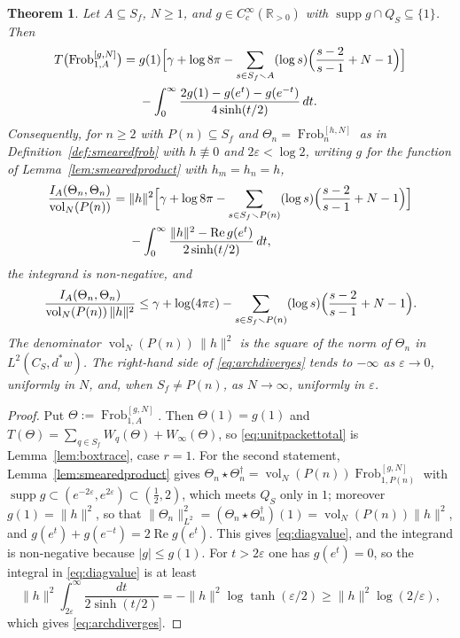 \documentclass[11pt]{amsart}
\newtheorem{theorem}{Theorem}[section]
\theoremstyle{definition}
\newcommand{\R}{\mathbb R}
\newcommand{\Rel}{\operatorname{Re}}
\newcommand{\Frob}{\operatorname{Frob}}
\newcommand{\supp}{\operatorname{supp}}
\newcommand{\vol}{\operatorname{vol}}
\begin{document}
\begin{theorem}\label{thm:gramdiag}
Let $A\subseteq S_f$, $N\ge1$, and $g\in C_c^\infty(\R_{>0})$ with
$\supp g\cap Q_S\subseteq\{1\}$. Then
\begin{equation}\label{eq:unitpackettotal}
\begin{aligned}
  T\bigl(\Frob_{1,A}^{[g,N]}\bigr)={}&g(1)\Bigl[\gamma+\log8\pi
   -\sum_{s\in S_f\smallsetminus A}(\log s)\Bigl(\frac{s-2}{s-1}+N-1\Bigr)
   \Bigr]\\
  &-\int_0^\infty\frac{2g(1)-g(e^t)-g(e^{-t})}{4\sinh(t/2)}\,dt .
\end{aligned}
\end{equation}
Consequently, for $n\ge2$ with $P(n)\subseteq S_f$ and
$\Theta_n=\Frob_n^{[h,N]}$ as in Definition~\ref{def:smearedfrob} with
$h\not\equiv0$ and $2\varepsilon<\log2$, writing $g$ for the function of
Lemma~\ref{lem:smearedproduct} with $h_m=h_n=h$,
\begin{equation}\label{eq:diagvalue}
\begin{aligned}
  \frac{I_A(\Theta_n,\Theta_n)}{\vol_N(P(n))}={}&\|h\|^2\Bigl[\gamma+\log8\pi
   -\sum_{s\in S_f\smallsetminus P(n)}(\log s)\Bigl(\frac{s-2}{s-1}+N-1\Bigr)
   \Bigr]\\
  &-\int_0^\infty\frac{\|h\|^2-\Rel g(e^t)}{2\sinh(t/2)}\,dt ,
\end{aligned}
\end{equation}
the integrand is non-negative, and
\begin{equation}\label{eq:archdiverges}
  \frac{I_A(\Theta_n,\Theta_n)}{\vol_N(P(n))\,\|h\|^2}\le\gamma+\log(4\pi
   \varepsilon)-\sum_{s\in S_f\smallsetminus P(n)}(\log s)
   \Bigl(\frac{s-2}{s-1}+N-1\Bigr).
\end{equation}
The denominator $\vol_N(P(n))\,\|h\|^2$ is the square of the norm of
$\Theta_n$ in $L^2(C_S,d^*w)$. The right-hand side of \eqref{eq:archdiverges}
tends to $-\infty$ as $\varepsilon\to0$, uniformly in $N$, and, when
$S_f\ne P(n)$, as $N\to\infty$, uniformly in $\varepsilon$.
\end{theorem}

\begin{proof}
Put $\Theta:=\Frob_{1,A}^{[g,N]}$. Then $\Theta(1)=g(1)$ and
$T(\Theta)=\sum_{q\in S_f}W_q(\Theta)+W_\infty(\Theta)$, so
\eqref{eq:unitpackettotal} is Lemma~\ref{lem:boxtrace}, case $r=1$. For the
second statement, Lemma~\ref{lem:smearedproduct} gives
$\Theta_n\star\Theta_n^\dagger=\vol_N(P(n))\Frob_{1,P(n)}^{[g,N]}$ with
$\supp g\subset(e^{-2\varepsilon},e^{2\varepsilon})\subset(\tfrac12,2)$, which
meets $Q_S$ only in $1$; moreover $g(1)=\|h\|^2$, so that
$\|\Theta_n\|_{L^2}^2=(\Theta_n\star\Theta_n^\dagger)(1)
=\vol_N(P(n))\|h\|^2$, and
$g(e^t)+g(e^{-t})=2\Rel g(e^t)$. This gives \eqref{eq:diagvalue}, and the
integrand is non-negative because $|g|\le g(1)$. For $t>2\varepsilon$ one has
$g(e^t)=0$, so the integral in \eqref{eq:diagvalue} is at least
\[
  \|h\|^2\int_{2\varepsilon}^\infty\frac{dt}{2\sinh(t/2)}
   =-\|h\|^2\log\tanh(\varepsilon/2)\ge\|h\|^2\log(2/\varepsilon),
\]
which gives \eqref{eq:archdiverges}.
\end{proof}
\end{document}
